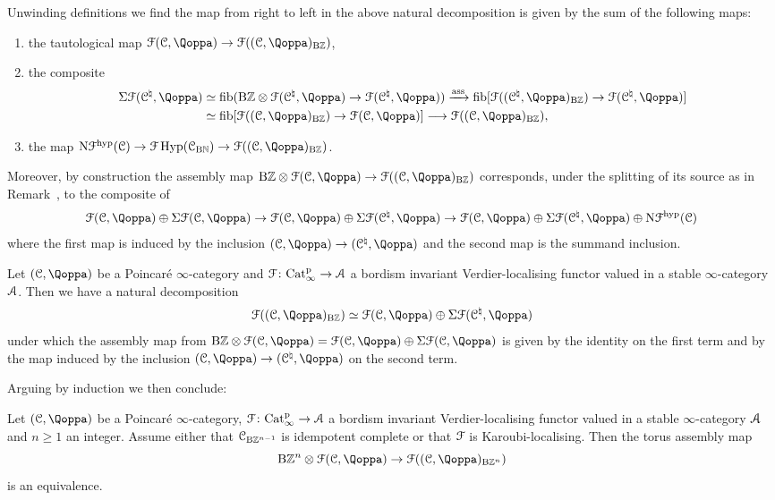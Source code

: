 \begin{remark}
Unwinding definitions we find the map from right to left in the above natural decomposition is given by the sum of the following maps:
\begin{enumerate}
\item the tautological map $\F(\C,\QF) \rightarrow \F((\C,\QF)_{\B\ZZ})$,
\item the composite 
\begin{align*}
\Sig \F(\C^\natural,\QF) & \simeq \fib(\B\ZZ \otimes \F(\C^\natural,\QF) \rightarrow \F(\C^\natural,\QF)) \xrightarrow{\ass} \fib[\F((\C^\natural,\QF)_{\B\ZZ}) \rightarrow \F(\C^\natural,\QF)] \\
		& \simeq \fib[\F((\C,\QF)_{\B\ZZ}) \rightarrow \F(\C,\QF)] \longrightarrow \F((\C,\QF)_{\B\ZZ}),
\end{align*}
\item the map $\N\F^\hyp(\C) \rightarrow \F\Hyp(\C_{\B\NN}) \rightarrow \F((\C,\QF)_{\B\ZZ})$.
\end{enumerate}
Moreover, by construction the assembly map $\B\ZZ \otimes \F(\C,\QF) \to \F((\C,\QF)_{\B\ZZ})$ corresponds, under the splitting of its source as in 
Remark~,
to the composite of
\[
\F(\C,\QF) \oplus \Sig\F(\C,\QF) \to \F(\C,\QF) \oplus \Sig\F(\C^\natural,\QF) \to \F(\C,\QF) \oplus \Sig\F(\C^\natural,\QF) \oplus \N\F^{\hyp}(\C)
\]
where the first map is induced by the inclusion $(\C,\QF) \to (\C^\natural,\QF)$ and the second map is the summand inclusion. 
\end{remark}




\begin{corollary}
\label{corollary:algebraic-shaneson-splitting}%
Let $(\C,\QF)$ be a Poincaré $\infty$-category and $\mathcal{F}\colon \mathrm{Cat}^{\mathrm p}_\infty \to \mathcal{A}$ a bordism invariant Verdier-localising functor valued in a stable $\infty$-category $\mathcal{A}$. Then we have a natural decomposition
\[
\F((\C,\QF)_{\B\ZZ}) \simeq \F(\C,\QF) \oplus \Sig\F(\C^\natural,\QF)
\]
under which the assembly map from $\B\ZZ \otimes \F(\C,\QF) = \F(\C,\QF) \oplus \Sig\F(\C,\QF)$
is given by the identity on the first term and by the map induced by the inclusion $(\C,\QF) \to (\C^\natural,\QF)$ on the second term.
\end{corollary}

Arguing by induction we then conclude:
\begin{corollary}
\label{corollary:iterated-shaneson-splitting}%
Let $(\C,\QF)$ be a Poincaré $\infty$-category, $\mathcal{F}\colon \mathrm{Cat}^{\mathrm p}_\infty \to \mathcal{A}$ a bordism invariant Verdier-localising functor valued in a stable $\infty$-category $\mathcal{A}$ and $n \geq 1$ an integer. Assume either that $\mathcal C_{\mathrm{B}\mathbb{Z}^{n-1}}$ is idempotent complete or that $\mathcal{F}$ is Karoubi-localising. Then the torus
assembly map
\[
\B\ZZ^n \otimes \F(\C,\QF) \to \F((\C,\QF)_{\B\ZZ^n})
\]
is an equivalence.
\end{corollary}



